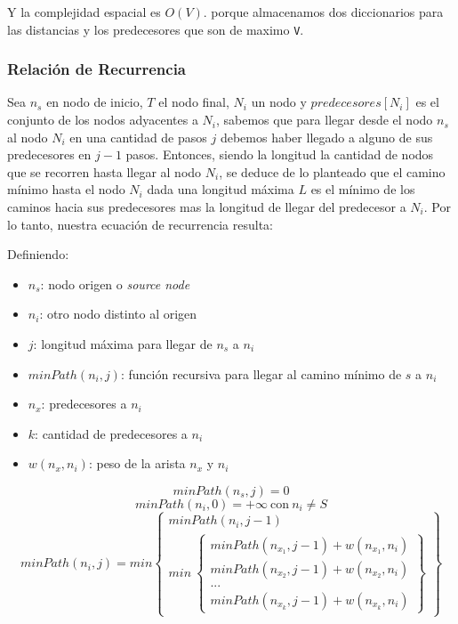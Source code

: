 \documentclass[titlepage,a4paper]{article}
\begin{document}
Y la complejidad espacial es \(O(V)\). porque almacenamos dos diccionarios para
las distancias y los predecesores que son de maximo \texttt{V}.

\subsubsection{Relación de Recurrencia}
\label{sec:orgb8ade23}

Sea \(n_s\) en nodo de inicio, \(T\) el nodo final, \(N_i\) un nodo y \(predecesores[N_i]\) es el
conjunto de los nodos adyacentes a \(N_i\), sabemos que para llegar desde el nodo \(n_s\)
al nodo \(N_i\) en una cantidad de pasos \(j\) debemos haber llegado a alguno de sus
predecesores en \(j-1\) pasos. Entonces, siendo la longitud la cantidad de nodos que
se recorren hasta llegar al nodo \(N_i\), se deduce de lo planteado que el camino
mínimo hasta el nodo \(N_i\) dada una longitud máxima \(L\) es el mínimo de los caminos
hacia sus predecesores mas la longitud de llegar del predecesor a \(N_i\). Por lo
tanto, nuestra ecuación de recurrencia resulta:

Definiendo:
\begin{itemize}
\item \(n_s\): nodo origen o \emph{source node}
\item \(n_i\): otro nodo distinto al origen
\item \(j\): longitud máxima para llegar de \(n_s\) a \(n_i\)
\item \(minPath(n_i, j)\): función recursiva para llegar al camino mínimo de \(s\) a \(n_i\)
\item \(n_x\): predecesores a \(n_i\)
\item \(k\): cantidad de predecesores a \(n_i\)
\item \(w(n_x,n_i)\): peso de la arista \(n_x\) y \(n_i\)
\end{itemize}

$$minPath(n_s, j) = 0$$
$$minPath(n_i, 0) = +\infty\ \text{con}\ n_i \neq S$$
$$
minPath(n_i, j) = min \left\{\begin{array}{lcc}
                        minPath(n_i, j-1) \\
                        min\ \left\{\begin{array}{lcc}
                               minPath(n_x_1, j-1) + w(n_x_1,n_i) \\
                               minPath(n_x_2, j-1) + w(n_x_2,n_i) \\
                               ... \\
                               minPath(n_x_k, j-1) + w(n_x_k,n_i)
                             \end{array}\right\}
                      \end{array}\right\}
$$
\end{document}
